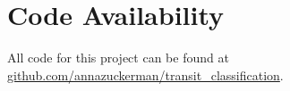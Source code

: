 \documentclass{article}
\begin{document}

 \section{Code Availability}
 All code for this project can be found at \href{https://github.com/annazuckerman/transit_classification}{github.com/annazuckerman/transit\_classification}.
 

{}

\end{document}
